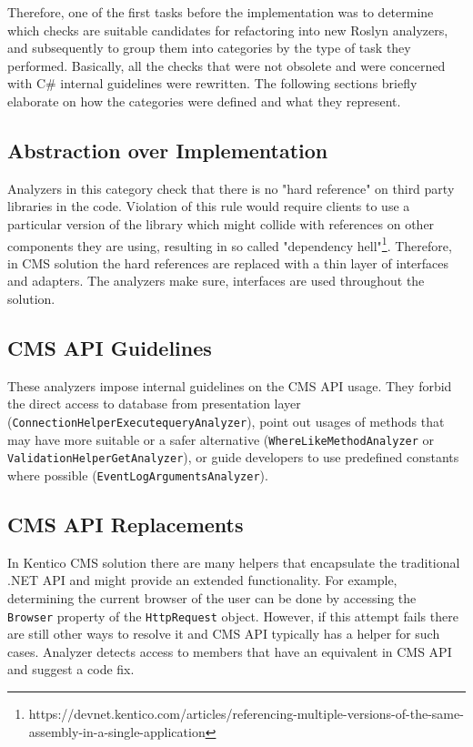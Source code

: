 \documentclass[
  digital, %
  table,   %
  lof,     %
  lot,     %
  oneside,
]{fithesis3}
\begin{document}
Therefore, one of the first tasks before the implementation was to determine which checks are suitable candidates for refactoring into new Roslyn analyzers, and subsequently to group them into categories by the type of task they performed. Basically, all the checks that were not obsolete and were concerned with C\# internal guidelines were rewritten. The following sections briefly elaborate on how the categories were defined and what they represent. 

\subsection{Abstraction over Implementation}
Analyzers in this category check that there is no "hard reference" on third party libraries in the code. Violation of this rule would require clients to use a particular version of the library which might collide with references on other components they are using, resulting in so called "dependency hell"\footnote{https://devnet.kentico.com/articles/referencing-multiple-versions-of-the-same-assembly-in-a-single-application}. Therefore, in CMS solution the hard references are replaced with a thin layer of interfaces and adapters. The analyzers make sure, interfaces are used throughout the solution.

\subsection{CMS API Guidelines}
These analyzers impose internal guidelines on the CMS API usage. They forbid the direct access to database from presentation layer (\texttt{ConnectionHelperExecutequeryAnalyzer}), point out usages of methods that may have more suitable or a safer alternative (\texttt{WhereLikeMethodAnalyzer} or \texttt{ValidationHelperGetAnalyzer}), or guide developers to use predefined constants where possible (\texttt{EventLogArgumentsAnalyzer}).

\subsection{CMS API Replacements}
In Kentico CMS solution there are many helpers that encapsulate the traditional .NET API and might provide an extended functionality. For example, determining the current browser of the user can be done by accessing the \texttt{Browser} property of the \texttt{HttpRequest} object. However, if this attempt fails there are still other ways to resolve it and CMS API typically has a helper for such cases. Analyzer detects access to members that have an equivalent in CMS API and suggest a code fix. 
\end{document}
